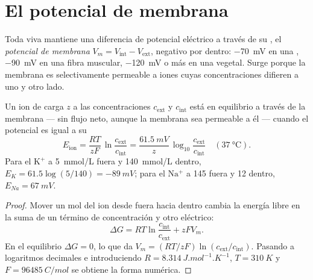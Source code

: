 \section{El potencial de membrana}

\begin{definition}\label{def:b1:membranes-transport:potential}
Toda  viva mantiene una diferencia de potencial eléctrico a través de
su , el \emph{potencial de membrana} $V_m = V_{\text{int}} - V_{\text{ext}}$, negativo por dentro:
\qty{-70}{mV} en una , \qty{-90}{mV} en una fibra muscular,
\qty{-120}{mV} o más en una  vegetal. Surge porque la membrana es
selectivamente permeable a iones cuyas concentraciones difieren a uno y otro
lado.
\end{definition}

\begin{theorem}\label{thm:b1:membranes-transport:nernst}
Un ion de carga $z$ a las concentraciones $c_{\text{ext}}$ y
$c_{\text{int}}$ está en equilibrio a través de la membrana --- sin flujo
neto, aunque la membrana sea permeable a él --- cuando el potencial es igual
a su \emph{}
\[
E_{\text{ion}} = \frac{RT}{zF}\,\ln\frac{c_{\text{ext}}}{c_{\text{int}}}
= \frac{\qty{61.5}{mV}}{z}\,\log_{10}\frac{c_{\text{ext}}}{c_{\text{int}}}
\quad (\qty{37}{\celsius}).
\]
Para el $\mathrm{K^+}$ a \qty{5}{mmol/L} fuera y \qty{140}{mmol/L} dentro,
$E_K = 61.5\log(5/140) = \qty{-89}{mV}$; para el $\mathrm{Na^+}$ a
\qty{145}{} fuera y \qty{12}{} dentro, $E_{Na} = \qty{+67}{mV}$.
\end{theorem}
\begin{proof}
Mover un mol del ion desde fuera hacia dentro cambia la energía libre en la
suma de un término de concentración y otro eléctrico:
\[
\Delta G = RT\ln\frac{c_{\text{int}}}{c_{\text{ext}}} + zFV_m .
\]
En el equilibrio $\Delta G = 0$, lo que da $V_m = (RT/zF)\ln(c_{\text{ext}}/c_{\text{int}})$.
Pasando a logaritmos decimales e introduciendo $R = \qty{8.314}{J.mol^{-1}.K^{-1}}$,
$T = \qty{310}{K}$ y $F = \qty{96485}{C/mol}$ se obtiene la forma numérica.
\end{proof}

